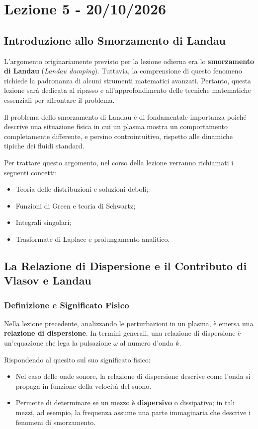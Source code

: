 \chapter{Lezione 5 - 20/10/2026}

\section{Introduzione allo Smorzamento di Landau}
L'argomento originariamente previsto per la lezione odierna era lo \textbf{smorzamento di Landau} (\textit{Landau damping}). Tuttavia, la comprensione di questo fenomeno richiede la padronanza di alcuni strumenti matematici avanzati. Pertanto, questa lezione sarà dedicata al ripasso e all'approfondimento delle tecniche matematiche essenziali per affrontare il problema.

Il problema dello smorzamento di Landau è di fondamentale importanza poiché descrive una situazione fisica in cui un plasma mostra un comportamento completamente differente, e persino controintuitivo, rispetto alle dinamiche tipiche dei fluidi standard.

Per trattare questo argomento, nel corso della lezione verranno richiamati i seguenti concetti:
\begin{itemize}
\item Teoria delle distribuzioni e soluzioni deboli;
\item Funzioni di Green e teoria di Schwartz;
\item Integrali singolari;
\item Trasformate di Laplace e prolungamento analitico.
\end{itemize}

\section{La Relazione di Dispersione e il Contributo di Vlasov e Landau}

\subsection{Definizione e Significato Fisico}
Nella lezione precedente, analizzando le perturbazioni in un plasma, è emersa una \textbf{relazione di dispersione}. In termini generali, una relazione di dispersione è un'equazione che lega la pulsazione $\omega$ al numero d'onda $k$.

Rispondendo al quesito sul suo significato fisico:
\begin{itemize}
\item Nel caso delle onde sonore, la relazione di dispersione descrive come l'onda si propaga in funzione della velocità del suono.
\item Permette di determinare se un mezzo è \textbf{dispersivo} o dissipativo; in tali mezzi, ad esempio, la frequenza assume una parte immaginaria che descrive i fenomeni di smorzamento.
\end{itemize}

